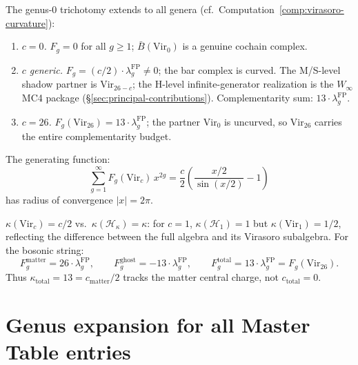 \begin{remark}\label{rem:vir-trichotomy-genera}
The genus-0 trichotomy extends to all genera (cf.\ Computation~\ref{comp:virasoro-curvature}):
\begin{enumerate}
\item \emph{$c = 0$.} $F_g = 0$ for all $g \geq 1$; $\bar{B}(\mathrm{Vir}_0)$ is a genuine cochain complex.
\item \emph{$c$ generic.} $F_g = (c/2) \cdot \lambda_g^{\mathrm{FP}} \neq 0$; the bar complex is curved.  The M/S-level shadow partner is $\mathrm{Vir}_{26-c}$; the H-level infinite-generator realization is the $W_\infty$ MC4 package (\S\ref{sec:principal-contributions}).  Complementarity sum: $13 \cdot \lambda_g^{\mathrm{FP}}$.
\item \emph{$c = 26$.} $F_g(\mathrm{Vir}_{26}) = 13 \cdot \lambda_g^{\mathrm{FP}}$; the partner $\mathrm{Vir}_0$ is uncurved, so $\mathrm{Vir}_{26}$ carries the entire complementarity budget.
\end{enumerate}
The generating function:
\begin{equation}\label{eq:vir-generating}
\sum_{g=1}^{\infty} F_g(\mathrm{Vir}_c)\, x^{2g} = \frac{c}{2}\left(\frac{x/2}{\sin(x/2)} - 1\right)
\end{equation}
has radius of convergence $|x| = 2\pi$.
\end{remark}

\begin{remark}\label{rem:vir-bosonic-string-genus}
$\kappa(\mathrm{Vir}_c) = c/2$ vs.\ $\kappa(\mathcal{H}_\kappa) = \kappa$: for $c=1$, $\kappa(\mathcal{H}_1) = 1$ but $\kappa(\mathrm{Vir}_1) = 1/2$, reflecting the difference between the full algebra and its Virasoro subalgebra.  For the bosonic string:
\[
F_g^{\text{matter}} = 26 \cdot \lambda_g^{\mathrm{FP}}, \qquad
F_g^{\text{ghost}} = -13 \cdot \lambda_g^{\mathrm{FP}},
\qquad F_g^{\text{total}} = 13 \cdot \lambda_g^{\mathrm{FP}} = F_g(\mathrm{Vir}_{26}).
\]
Thus $\kappa_{\text{total}} = 13 = c_{\text{matter}}/2$ tracks the matter central charge, not $c_{\text{total}} = 0$.
\end{remark}

\section{Genus expansion for all Master Table entries}\label{sec:genus-all-master}

